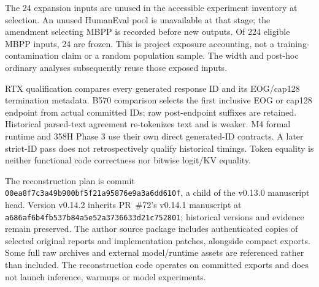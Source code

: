 The 24 expansion inputs are unused in the accessible experiment inventory at selection. An unused HumanEval pool is unavailable at that stage; the amendment selecting MBPP is recorded before new outputs. Of 224 eligible MBPP inputs, 24 are frozen. This is project exposure accounting, not a training-contamination claim or a random population sample. The width and post-hoc ordinary analyses subsequently reuse those exposed inputs.

RTX qualification compares every generated response ID and its EOG/cap128 termination metadata. B570 comparison selects the first inclusive EOG or cap128 endpoint from actual committed IDs; raw post-endpoint suffixes are retained. Historical parsed-text agreement re-tokenizes text and is weaker. M4 formal runtime and 358H Phase 3 use their own direct generated-ID contracts. A later strict-ID pass does not retrospectively qualify historical timings. Token equality is neither functional code correctness nor bitwise logit/KV equality.

The reconstruction plan is commit \nolinkurl{00ea8f7c3a49b900bf5f21a95876e9a3a6dd610f}, a child of the v0.13.0 manuscript head. Version v0.14.2 inherits PR~\#72's v0.14.1 manuscript at \nolinkurl{a686af6b4fb537b84a5e52a3736633d21c752801}; historical versions and evidence remain preserved. The author source package includes authenticated copies of selected original reports and implementation patches, alongside compact exports. Some full raw archives and external model/runtime assets are referenced rather than included. The reconstruction code operates on committed exports and does not launch inference, warmups or model experiments.
